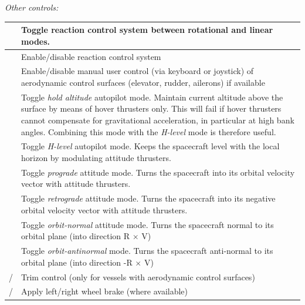 \documentclass[Orbiter User Manual.tex]{subfiles}
\begin{document}

\emph{Other controls:}

	\begin{longtable}{ >{\RaggedRight}p{}
		>{\RaggedRight}p{} }
	\hline
	\keystroke{/}\num{} & Toggle reaction control system between rotational and
		linear modes.\\
	\hline
	\keystroke{\ctrl,/}\num{} & Enable/disable reaction control system\\
	\hline
	\keystroke{\alt,/}\num{} & Enable/disable manual user control (via keyboard
		or joystick) of aerodynamic control surfaces (elevator, rudder,
		ailerons) if available\\
	\hline
	\keystroke{A} & Toggle \emph{hold altitude} autopilot mode. Maintain current
		altitude above the surface by means of hover thrusters only. This will
		fail if hover thrusters cannot compensate for gravitational
		acceleration, in particular at high bank angles. Combining this mode
		with the \emph{H-level} mode is therefore useful.\\
	\hline
	\keystroke{L} & Toggle \emph{H-level} autopilot mode. Keeps the spacecraft
		level with the local horizon by modulating attitude thrusters.\\
	\hline
	\keystroke{[} & Toggle \emph{prograde} attitude mode. Turns the spacecraft
		into its orbital velocity vector with attitude thrusters.\\
	\hline
	\keystroke{]} & Toggle \emph{retrograde} attitude mode. Turns the spacecraft
		into its negative orbital velocity vector with attitude thrusters.\\
	\hline
	\keystroke{;} & Toggle \emph{orbit-normal} attitude mode. Turns the
		spacecraft normal to its orbital plane (into direction R $\times$ V)\\
	\hline
	\keystroke{'} & Toggle \emph{orbit-antinormal} mode. Turns the spacecraft
		anti-normal to its orbital plane (into direction -R $\times$ V)\\
	\hline
	\keystroke{Ins}/\keystroke{Del}\cur{} & Trim control (only for vessels with
		aerodynamic control surfaces)\\
	\hline
	\keystroke{{,}}/\keystroke{.} & Apply left/right wheel brake (where
		available)\\
	\hline
	\end{longtable}
\end{document}
